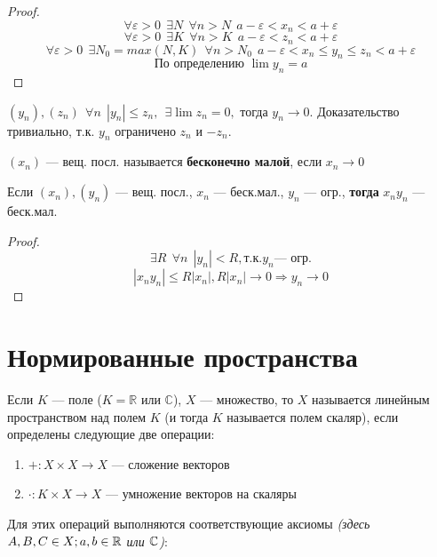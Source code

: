 \begin{proof}
$$\forall \varepsilon>0 \ \ \exists N \ \ \forall n>N \ \ a-\varepsilon<x_n<a+\varepsilon$$
$$\forall \varepsilon>0 \ \ \exists K \ \ \forall n>K \ \ a-\varepsilon<z_n<a+\varepsilon$$
$$\forall \varepsilon > 0 \ \ \exists N_0=max(N,K) \ \ \forall n>N_0 \ \ a-\varepsilon<x_n\leq y_n\leq z_n<a+\varepsilon$$
$$\text{По определению } \lim y_n=a$$
\end{proof}

\begin{consequence}
$(y_n), (z_n) \ \ \forall n \ \ |y_n|\leq z_n, \ \ \exists \lim z_n=0, \text{ тогда } y_n\to 0$. Доказательство тривиально, т.к. $y_n$ ограничено $z_n$ и $-z_n$.
\end{consequence}

\begin{definition}
$(x_n)$ --- вещ. посл. называется \textbf{бесконечно малой}, если $x_n\to 0$
\end{definition}

\begin{theorem}
Если $(x_n),(y_n)$ --- вещ. посл., $x_n$ --- беск.мал., $y_n$ --- огр., \textbf{тогда} $x_ny_n$ --- беск.мал.
\end{theorem}

\begin{proof}
$$\exists R \ \ \forall n \ \ |y_n|<R, \text{т.к.} y_n \text{--- огр.} $$
$$|x_ny_n|\leq R|x_n|, R|x_n|\to 0 \Rightarrow y_n\to0$$
\end{proof}

\section*{Нормированные пространства}

\begin{definition}
Если $K$ --- поле ($K=\mathbb{R}$ или $\mathbb{C}$), $X$ --- множество, то $X$ называется линейным пространством над полем $K$ (и тогда $K$ называется полем скаляр), если определены следующие две операции:
\begin{enumerate}
    \item $+:X\times X \to X$ --- сложение векторов
    \item $\cdot:K\times X\to X$ --- умножение векторов на скаляры
\end{enumerate}
\end{definition}

Для этих операций выполняются соответствующие аксиомы \textit{(здесь $A,B,C\in X; a,b\in \operatorname*{\mathbb{R}}$ или $\operatorname*{\mathbb{C}}$)}:

